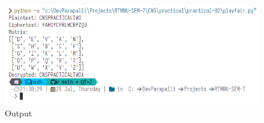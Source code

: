\documentclass[12pt,a4paper]{article}
\begin{document}


\begin{figure}[h]
    \caption{Output}
    \centering
    \includegraphics[width=\textwidth]{output.png}
\end{figure}

\newpage

\end{document}
